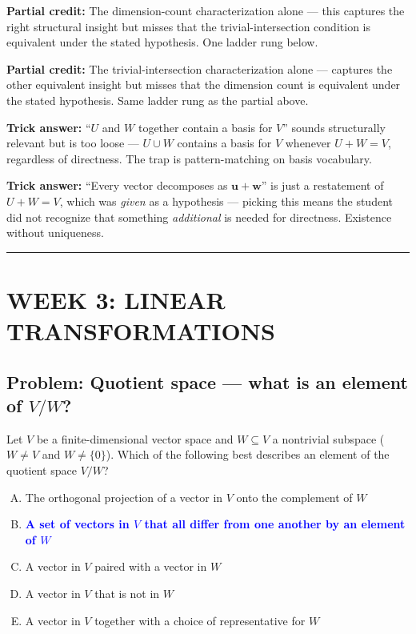 \documentclass[12pt]{amsart}
\newcommand{\divider}{
  \vspace{-1em}
  \noindent
  \raisebox{-0.15ex}{\textbullet}%
  \hspace{0.5em}%
  \rule[0.5ex]{0.95\textwidth}{1.0pt}%
  \hspace{0.5em}%
  \raisebox{-0.15ex}{\textbullet}%
  \vspace{0em}
}
\begin{document}
\textbf{Partial credit:}
The dimension-count characterization alone --- this captures the right
structural insight but misses that the trivial-intersection condition is
equivalent under the stated hypothesis. One ladder rung below.

\textbf{Partial credit:}
The trivial-intersection characterization alone --- captures the other
equivalent insight but misses that the dimension count is equivalent under
the stated hypothesis. Same ladder rung as the partial above.

\textbf{Trick answer:}
``$U$ and $W$ together contain a basis for $V$'' sounds structurally
relevant but is too loose --- $U \cup W$ contains a basis for $V$ whenever
$U + W = V$, regardless of directness. The trap is pattern-matching on
basis vocabulary.

\textbf{Trick answer:}
``Every vector decomposes as $\mathbf{u} + \mathbf{w}$'' is just a
restatement of $U + W = V$, which was \emph{given} as a hypothesis ---
picking this means the student did not recognize that something
\emph{additional} is needed for directness. Existence without uniqueness.

\divider

\section*{WEEK 3: LINEAR TRANSFORMATIONS}

\subsection*{Problem: Quotient space --- what is an element of $V/W$?}

Let $V$ be a finite-dimensional vector space and $W \subseteq V$ a nontrivial
subspace ($W \neq V$ and $W \neq \{0\}$).
Which of the following best describes an element of the quotient space $V/W$?

\begin{enumerate}[(A)]
\item The orthogonal projection of a vector in $V$ onto the complement of $W$
\item \textcolor{blue}{\textbf{A set of vectors in $V$ that all differ from one another by an element of $W$}}
\item A vector in $V$ paired with a vector in $W$
\item A vector in $V$ that is not in $W$
\item A vector in $V$ together with a choice of representative for $W$
\end{enumerate}
\end{document}
